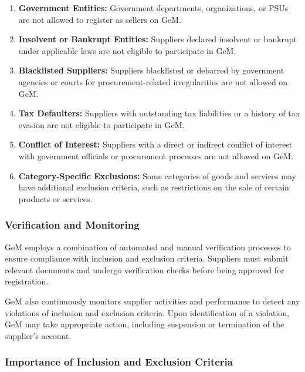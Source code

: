 \begin{enumerate}
    \item \textbf{Government Entities:} Government departments, organizations, or PSUs are not allowed to register as sellers on GeM.
    
    \item \textbf{Insolvent or Bankrupt Entities:} Suppliers declared insolvent or bankrupt under applicable laws are not eligible to participate in GeM.
    
    \item \textbf{Blacklisted Suppliers:} Suppliers blacklisted or debarred by government agencies or courts for procurement-related irregularities are not allowed on GeM.
    
    \item \textbf{Tax Defaulters:} Suppliers with outstanding tax liabilities or a history of tax evasion are not eligible to participate in GeM.
    
    \item \textbf{Conflict of Interest:} Suppliers with a direct or indirect conflict of interest with government officials or procurement processes are not allowed on GeM.
    
    \item \textbf{Category-Specific Exclusions:} Some categories of goods and services may have additional exclusion criteria, such as restrictions on the sale of certain products or services.
\end{enumerate}

\subsubsection{Verification and Monitoring}

GeM employs a combination of automated and manual verification processes to ensure compliance with inclusion and exclusion criteria. Suppliers must submit relevant documents and undergo verification checks before being approved for registration.

GeM also continuously monitors supplier activities and performance to detect any violations of inclusion and exclusion criteria. Upon identification of a violation, GeM may take appropriate action, including suspension or termination of the supplier's account.

\subsubsection{Importance of Inclusion and Exclusion Criteria}

